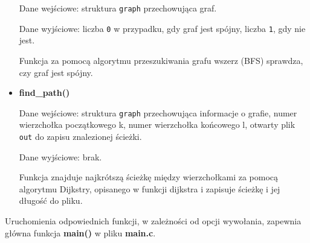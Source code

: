 \documentclass[]{article}
\begin{document}
\begin{itemize}
Dane wejściowe: struktura \texttt{graph} przechowująca graf.

Dane wyjściowe: liczba \texttt{0} w przypadku, gdy graf jest spójny, liczba \texttt{1}, gdy nie jest.

Funkcja za pomocą algorytmu przeszukiwania grafu wszerz (BFS) sprawdza, czy graf jest spójny.
\item
  \textbf{find\_path()}

Dane wejściowe: struktura \texttt{graph} przechowująca informacje o grafie, numer wierzchołka początkowego k, numer wierzchołka końcowego l, otwarty plik \texttt{out} do zapisu znalezionej ścieżki.

Dane wyjściowe: brak.

Funkcja znajduje najkrótszą ścieżkę między wierzchołkami za pomocą algorytmu Dijkstry, opisanego w funkcji dijkstra i zapisuje ścieżkę i jej długość do pliku.
\end{itemize}

Uruchomienia odpowiednich funkcji, w zależności od opcji wywołania, zapewnia główna funkcja \textbf{main()} w pliku \textbf{main.c}.
\end{document}
